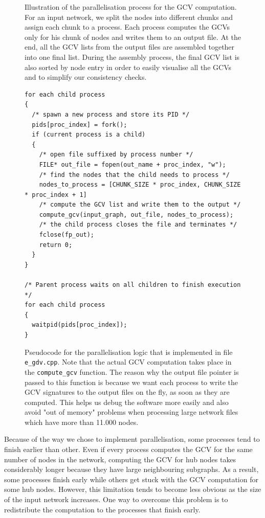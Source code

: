 \begin{figure}[H]
\begin{center}
\begin{tikzpicture}[scale=1.0,auto,swap,post/.style={->,shorten >=3pt,>=stealth',thick}]
  \end{tikzpicture}
  \caption[Parallelisation process for the GCV computation]{Illustration of the parallelisation process for the GCV computation. For an input network, we split the nodes into different chunks and assign each chunk to a process. Each process computes the GCVs only for his chunk of nodes and writes them to an output file. At the end, all the GCV lists from the output files are assembled together into one final list. During the assembly process, the final GCV list is also sorted by node entry in order to easily visualise all the GCVs and to simplify our consistency checks.}
  \label{fig:parallelisation_process}
  \end{center}
\end{figure}%


\begin{figure}
\begin{lstlisting}
for each child process
{
  /* spawn a new process and store its PID */
  pids[proc_index] = fork();
  if (current process is a child)
  {
    /* open file suffixed by process number */
    FILE* out_file = fopen(out_name + proc_index, "w");
    /* find the nodes that the child needs to process */
    nodes_to_process = [CHUNK_SIZE * proc_index, CHUNK_SIZE * proc_index + 1]
    /* compute the GCV list and write them to the output */
    compute_gcv(input_graph, out_file, nodes_to_process);
    /* the child process closes the file and terminates */
    fclose(fp_out);
    return 0;
  }
}

/* Parent process waits on all children to finish execution */
for each child process
{
  waitpid(pids[proc_index]);
}
\end{lstlisting}
\caption[Pseudocode for the parallelisation logic]{Pseudocode for the parallelisation logic that is implemented in file \lstinline|e_gdv.cpp|. Note that the actual GCV computation takes place in the \lstinline|compute_gcv| function. The reason why the output file pointer is passed to this function is because we want each process to write the GCV signatures to the output files on the fly, as soon as they are computed. This helps us debug the software more easily and also avoid "out of memory" problems when processing large network files which have more than 11.000 nodes.}
\label{fig:pseudocode_parallelisation}
\end{figure}

Because of the way we chose to implement parallelisation, some processes tend to finish earlier than other. Even if every process computes the GCV for the same number of nodes in the network, computing the GCV for hub nodes takes considerably longer because they have large neighbouring subgraphs. As a result, some processes finish early while others get stuck with the GCV computation for some hub nodes. However, this limitation tends to become less obvious as the size of the input network increases. One way to overcome this problem is to redistribute the computation to the processes that finish early.

